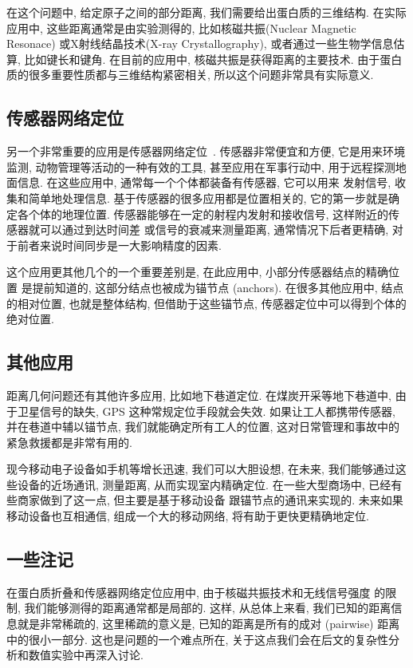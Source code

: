 在这个问题中, 给定原子之间的部分距离, 我们需要给出蛋白质的三维结构.
在实际应用中, 这些距离通常是由实验测得的, 比如核磁共振(Nuclear Magnetic Resonace)
或X射线结晶技术(X-ray Crystallography), 或者通过一些生物学信息估算, 比如键长和键角.
在目前的应用中, 核磁共振是获得距离的主要技术.
由于蛋白质的很多重要性质都与三维结构紧密相关, 
所以这个问题非常具有实际意义.
    
\subsection{传感器网络定位} 
另一个非常重要的应用是传感器网络定位~\cite{Akyildiz2002,Chong2003,Mao2007,Yick2008}.
传感器非常便宜和方便, 它是用来环境监测, 动物管理等活动的一种有效的工具, 
甚至应用在军事行动中, 用于远程探测地面信息.
在这些应用中, 通常每一个个体都装备有传感器, 它可以用来
发射信号, 收集和简单地处理信息.
基于传感器的很多应用都是位置相关的, 它的第一步就是确定各个体的地理位置.
传感器能够在一定的射程内发射和接收信号, 这样附近的传感器就可以通过到达时间差
或信号的衰减来测量距离, 通常情况下后者更精确, 
对于前者来说时间同步是一大影响精度的因素.

这个应用更其他几个的一个重要差别是, 在此应用中, 小部分传感器结点的精确位置
是提前知道的, 这部分结点也被成为锚节点 (anchors).
在很多其他应用中, 结点的相对位置, 也就是整体结构,
但借助于这些锚节点, 传感器定位中可以得到个体的绝对位置.
 
\subsection{其他应用}
距离几何问题还有其他许多应用, 比如地下巷道定位.
在煤炭开采等地下巷道中, 由于卫星信号的缺失, GPS 这种常规定位手段就会失效.
如果让工人都携带传感器, 并在巷道中辅以锚节点, 
我们就能确定所有工人的位置, 这对日常管理和事故中的紧急救援都是非常有用的.

现今移动电子设备如手机等增长迅速, 我们可以大胆设想, 
在未来, 我们能够通过这些设备的近场通讯, 测量距离, 从而实现室内精确定位.
在一些大型商场中, 已经有些商家做到了这一点, 但主要是基于移动设备
跟锚节点的通讯来实现的. 未来如果移动设备也互相通信,
组成一个大的移动网络, 将有助于更快更精确地定位.

\subsection{一些注记}
在蛋白质折叠和传感器网络定位应用中, 由于核磁共振技术和无线信号强度
的限制, 我们能够测得的距离通常都是局部的.
这样, 从总体上来看, 我们已知的距离信息就是非常稀疏的,
这里稀疏的意义是, 已知的距离是所有的成对 (pairwise) 距离中的很小一部分.
这也是问题的一个难点所在, 关于这点我们会在后文的复杂性分析和数值实验中再深入讨论.

